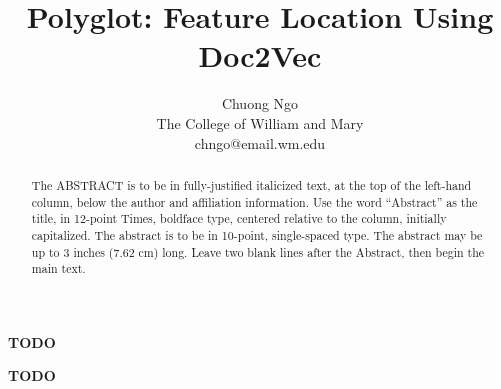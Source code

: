 \documentclass[times, 10pt,twocolumn]{article}
\newcommand{\projname}{Polyglot}
\begin{document}
\title{\projname: Feature Location Using Doc2Vec}

\author{Chuong Ngo\\
The College of William and Mary\\
chngo@email.wm.edu
}

\maketitle
\thispagestyle{empty}

\begin{abstract}
   The ABSTRACT is to be in fully-justified italicized text, at the top 
   of the left-hand column, below the author and affiliation 
   information. Use the word ``Abstract'' as the title, in 12-point 
   Times, boldface type, centered relative to the column, initially 
   capitalized. The abstract is to be in 10-point, single-spaced type. 
   The abstract may be up to 3 inches (7.62 cm) long. Leave two blank 
   lines after the Abstract, then begin the main text. 
\end{abstract}


\textbf{TODO} 


\textbf{TODO} 




\nocite{dit2013integrating,
	antoniol2006feature,
	poshyvanyk2006combining,
	wilde1992locating,
	biggerstaff1994program,
	eisenbarth2003locating,
	wilde1995software,
	salah2004hierarchy,
	antoniol2005feature,
	chen2000case,
	ottenstein1984program,
	horwitz1990interprocedural,
	horwitz1992use,
	marcus2004information,
	mcmillan2011portfolio,
	allamanis2015suggesting,
	allamanis2015bimodal,
	kiros2014multimodal,
	maddison2014structured,
	mikolov2013efficient,
	mnih2007three,
	mnih2013learning,
	hindle2012naturalness,
	mnih2012fast,
	bird2009natural,
	porter1980algorithm,
	manning2014stanford,
	jconwellcorenlp,
	le2014distributed,
	rehureklrec
}


\end{document}
